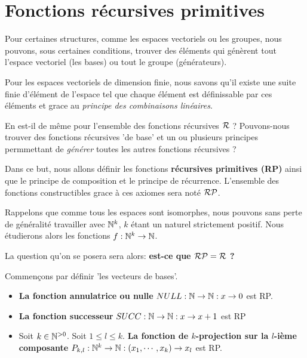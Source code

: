 \section{Fonctions récursives primitives}

Pour certaines structures, comme les espaces vectoriels ou les groupes, nous
pouvons, sous certaines conditions, trouver des éléments qui génèrent tout
l'espace vectoriel (les bases) ou tout le groupe (générateurs).

Pour les espaces vectoriels de dimension finie, nous savons qu'il existe une
suite finie d'élément de l'espace tel que chaque élément est définissable par
ces éléments et grace au \textit{principe des combinaisons linéaires}.

En est-il de même pour l'ensemble des fonctions récursives
$\mathcal{R}$ ? Pouvons-nous trouver des fonctions récursives 'de
base' et un ou plusieurs principes permmettant de \textit{générer} toutes les
autres fonctions récursives ?

Dans ce but, nous allons définir les fonctions \textbf{récursives primitives
(RP)} ainsi que le principe de composition et le principe de récurrence.
L'ensemble des fonctions constructibles grace à ces axiomes sera noté
$\mathcal{RP}$.

Rappelons que comme tous les espaces sont isomorphes, nous pouvons sans perte de
généralité travailler avec $\mathbb{N}^{k}$, $k$ étant un naturel strictement
positif. Nous étudierons alors les fonctions
$f : \mathbb{N}^{k} \rightarrow \mathbb{N}$.

\vspace{5mm}

La question qu'on se posera sera alors: \textbf{est-ce que
$\mathcal{RP} = \mathcal{R}$ ?}

\vspace{5mm}

Commençons par définir 'les vecteurs de bases'.

\begin{itemize}
	\item \textbf{La fonction annulatrice ou nulle} $NULL : \mathbb{N} \rightarrow \mathbb{N} : x \rightarrow 0$
		est RP.
	\item \textbf{La fonction successeur} $SUCC : \mathbb{N} \rightarrow \mathbb{N} : x \rightarrow x +
		1$ est RP
	\item Soit $k \in \mathbb{N}^{> 0}$. Soit $1 \leq l \leq k$. \textbf{La
			fonction de $k$-projection sur la $l$-ième composante} $P_{k, l} :
			\mathbb{N}^{k}
		\rightarrow \mathbb{N} : (x_{1}, \cdots, x_{k}) \rightarrow x_{l}$ est RP.
\end{itemize}

